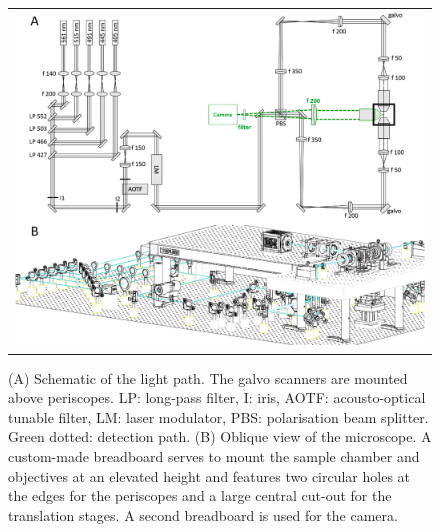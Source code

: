 \documentclass[12pt]{spieman}  %
\begin{document}
\begin{spacing}{2}
		\begin{figure}
   \begin{center}
   \begin{tabular}{c}
   \includegraphics[width=\textwidth]{frame1.eps}
   \end{tabular}
   \end{center}
   \caption{\label{fig:excitation} (A) Schematic of the light path. The galvo scanners are mounted above periscopes. LP: long-pass filter, I: iris, AOTF: acousto-optical tunable filter, LM: laser modulator, PBS: polarisation beam splitter. Green dotted: detection path. (B) Oblique view of the microscope. A custom-made breadboard serves to mount the sample chamber and objectives at an elevated height and features two circular holes at the edges for the periscopes and a large central cut-out for the translation stages. A second breadboard is used for the camera.} 
   \end{figure}


\end{spacing}
\end{document}
